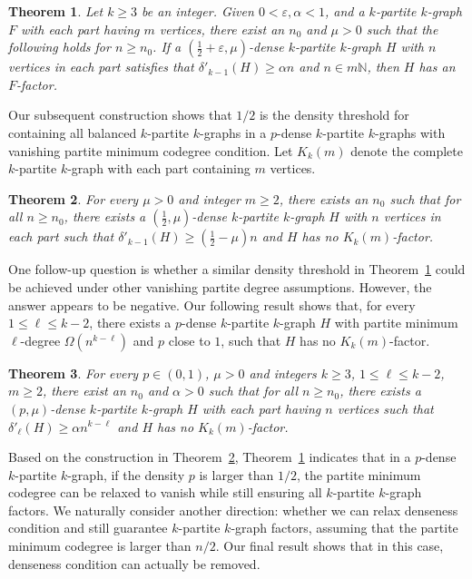 \documentclass[11pt,a4paper]{article}
\newtheorem{thm}{Theorem}[section]
\theoremstyle{definition}
\begin{document}
\begin{thm}\label{main}
    Let $k\geq 3$ be an integer. Given $0<\varepsilon, \alpha <1$, and a $k$-partite $k$-graph $F$ with each part having $m$ vertices, there exist an $n_0$ and $\mu >0$ such that the following holds for $n\geq n_0$. If a $(\frac{1}{2}+\varepsilon, \mu)$-dense $k$-partite $k$-graph $H$ with $n$ vertices in each part satisfies that $\delta'_{k-1}(H)\geq \alpha n$ and $n\in m\mathbb{N}$, then $H$ has an $F$-factor.
\end{thm}

Our subsequent construction shows that $1/2$ is the density threshold for containing all balanced $k$-partite $k$-graphs in a $p$-dense $k$-partite $k$-graphs with vanishing partite minimum codegree condition. Let $K_k(m)$ denote the complete $k$-partite $k$-graph with each part containing $m$ vertices. 

\begin{thm}\label{cons1}
    For every $\mu >0$ and integer $m\geq 2$, there exists an $n_0$ such that for all $n\geq n_0$, there exists a $(\frac{1}{2}, \mu)$-dense $k$-partite $k$-graph $H$ with $n$ vertices in each part such that $\delta'_{k-1}(H)\geq (\frac{1}{2}-\mu)n$ and $H$ has no $K_k(m)$-factor.
\end{thm}

One follow-up question is whether a similar density threshold in Theorem~\ref{main} could be achieved under other vanishing partite degree assumptions.
However, the answer appears to be negative. 
Our following result shows that, for every $1\leq \ell \leq k-2$, there exists a $p$-dense $k$-partite $k$-graph $H$ with partite minimum $\ell$-degree $\Omega(n^{k-\ell})$ and $p$ close to $1$, such that $H$ has no $K_k(m)$-factor.

\begin{thm}\label{cons2}
    For every $p\in (0,1)$, $\mu >0$ and integers $k\geq 3$, $1\leq \ell \leq k-2$, $m\geq 2$, there exist an $n_0$ and $\alpha >0$ such that for all $n\geq n_0$, there exists a $(p,\mu)$-dense $k$-partite $k$-graph $H$ with each part having $n$ vertices such that $\delta'_{\ell}(H)\geq \alpha n^{k-\ell}$ and $H$ has no $K_k(m)$-factor.
\end{thm}

Based on the construction in Theorem~\ref{cons1}, Theorem~\ref{main} indicates that in a $p$-dense $k$-partite $k$-graph, if the density $p$ is larger than $1/2$, the partite minimum codegree can be relaxed to vanish while still ensuring all $k$-partite $k$-graph factors. We naturally consider another direction: whether we can relax denseness condition and still guarantee $k$-partite $k$-graph factors, assuming that the partite minimum codegree is larger than $n/2$. Our final result shows that in this case, denseness condition can actually be removed.
\end{document}

